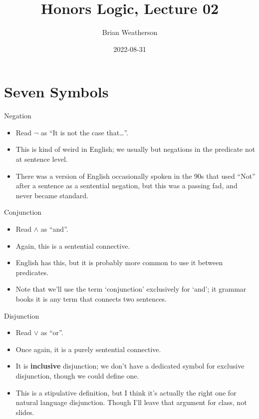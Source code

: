 \documentclass[
  17pt,
  letterpaper,
  ignorenonframetext,
  aspectratio=169,
  handout]{beamer}
\title{Honors Logic, Lecture 02}
\author{Brian Weatherson}
\date{2022-08-31}
\providecommand{\tightlist}{%
  \setlength{\itemsep}{0pt}\setlength{\parskip}{0pt}}\usepackage{longtable,booktabs,array}
\begin{document}
\frame{\titlepage}
\ifdefined\Shaded\renewenvironment{Shaded}{\begin{tcolorbox}[interior hidden, breakable, enhanced, borderline west={3pt}{0pt}{shadecolor}, boxrule=0pt, frame hidden, sharp corners]}{\end{tcolorbox}}\fi

\hypertarget{seven-symbols}{%
\section{Seven Symbols}\label{seven-symbols}}

\begin{frame}{Negation}
\protect\hypertarget{negation}{}
\begin{itemize}[<+->]
\tightlist
\item
  Read \(\neg\) as ``It is not the case that\ldots{}''.
\item
  This is kind of weird in English; we usually but negations in the
  predicate not at sentence level.
\item
  There was a version of English occasionally spoken in the 90s that
  used ``Not'' after a sentence as a sentential negation, but this was a
  passing fad, and never became standard.
\end{itemize}
\end{frame}

\begin{frame}{Conjunction}
\protect\hypertarget{conjunction}{}
\begin{itemize}[<+->]
\tightlist
\item
  Read \(\wedge\) as ``and''.
\item
  Again, this is a sentential connective.
\item
  English has this, but it is probably more common to use it between
  predicates.
\item
  Note that we'll use the term `conjunction' exclusively for `and'; it
  grammar books it is any term that connects two sentences.
\end{itemize}
\end{frame}

\begin{frame}{Disjunction}
\protect\hypertarget{disjunction}{}
\begin{itemize}[<+->]
\tightlist
\item
  Read \(\vee\) as ``or''.
\item
  Once again, it is a purely sentential connective.
\item
  It is \textbf{inclusive} disjunction; we don't have a dedicated symbol
  for exclusive disjunction, though we could define one.
\item
  This is a stipulative definition, but I think it's actually the right
  one for natural language disjunction. Though I'll leave that argument
  for class, not slides.
\end{itemize}
\end{frame}
\end{document}
